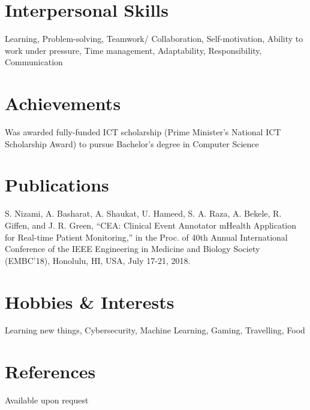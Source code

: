 \documentclass[letterpaper,12pt]{article}
\begin{document}
\section{Interpersonal Skills}
\small
Learning, Problem-solving, Teamwork/ Collaboration, Self-motivation, Ability to work under pressure, Time management, Adaptability, Responsibility, Communication

\section{Achievements}
\small
Was awarded fully-funded ICT scholarship (Prime Minister's National ICT Scholarship Award) to pursue Bachelor's degree in Computer Science

\section{Publications}
S. Nizami, A. Basharat, A. Shaukat, U. Hameed, S. A. Raza, A. Bekele, R. Giffen, and J. R. Green, “CEA: Clinical Event Annotator mHealth Application for Real-time Patient Monitoring,” in the Proc. of 40th Annual International Conference of the IEEE Engineering in Medicine and Biology Society (EMBC'18), Honolulu, HI, USA, July 17-21, 2018.


\section{Hobbies \& Interests}
Learning new things, Cybersecurity, Machine Learning, Gaming, Travelling, Food

\section{References}
Available upon request

\end{document}
